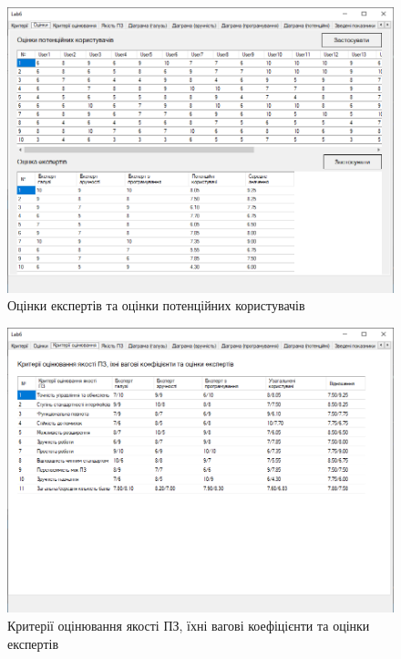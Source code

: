 \documentclass[14pt]{extreport}
\begin{document}
\begin{normalsize}
\begin{figure}[H]
	\centering
	\includegraphics[scale=0.55]{2}
	\caption{Оцінки експертів та оцінки потенційних користувачів}
\end{figure}

\begin{figure}[H]
	\centering
	\includegraphics[scale=0.55]{3}
	\caption{Критерії оцінювання якості ПЗ, їхні вагові коефіцієнти та оцінки експертів}
\end{figure}


\end{normalsize}
\end{document}
